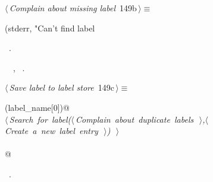 \documentclass[a4paper]{report}
\begin{document}
\begin{flushleft} \small
\begin{minipage}{\linewidth}\label{scrap328}\raggedright\small
{} $\langle\,${\it Complain about missing label}\nobreak\ {\footnotesize {149b}}$\,\rangle\equiv$
\vspace{-1ex}
\begin{list}{}{} \item
\mbox{}\verb@fprintf(stderr, "Can't find label %s.\n", label_name);@{\NWsep}
\end{list}
\vspace{-1.5ex}
\footnotesize
\begin{list}{}{\setlength{\itemsep}{-\parsep}\setlength{\itemindent}{-\leftmargin}}
\item \NWtxtMacroRefIn\ .
\item \NWtxtIdentsUsed\nobreak\  \verb@fprintf@\nobreak\ , \verb@stderr@\nobreak\ .
\item{}
\end{list}
\end{minipage}\vspace{4ex}
\end{flushleft}
\begin{flushleft} \small
\begin{minipage}{\linewidth}\label{scrap329}\raggedright\small
{} $\langle\,${\it Save label to label store}\nobreak\ {\footnotesize {149c}}$\,\rangle\equiv$
\vspace{-1ex}
\begin{list}{}{} \item
\mbox{}\verb@if (label_name[0])@\\
\mbox{}\verb@@\hbox{$\langle\,${\it Search for label($\langle\,${\it Complain about duplicate labels}\nobreak\ {\footnotesize {}}$\,\rangle$,$\langle\,${\it Create a new label entry}\nobreak\ {\footnotesize {}}$\,\rangle$)}\nobreak\ {\footnotesize {}}$\,\rangle$}\verb@@\\
\mbox{}\verb@else@\\
\mbox{}@{\NWsep}
\end{list}
\vspace{-1.5ex}
\footnotesize
\begin{list}{}{\setlength{\itemsep}{-\parsep}\setlength{\itemindent}{-\leftmargin}}
\item \NWtxtMacroRefIn\ .

\item{}
\end{list}
\end{minipage}\vspace{4ex}
\end{flushleft}
\end{document}
